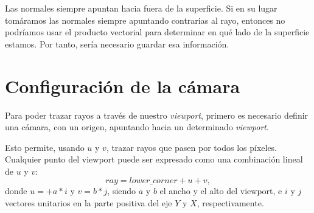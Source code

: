 \documentclass[12pt]{article}
\theoremstyle{definition}
\theoremstyle{remark}
\begin{document}
\tableofcontents

\vspace{1cm}

Las normales siempre apuntan hacia fuera de la superficie. Si en su lugar tomáramos las normales siempre apuntando contrarias al rayo, entonces no podríamos usar el producto vectorial para determinar en qué lado de la superficie estamos. Por tanto, sería necesario guardar esa información.


\section{Configuración de la cámara}

Para poder trazar rayos a través de nuestro \textit{viewport}, primero es necesario definir una cámara, con un origen, apuntando hacia un determinado \textit{viewport}.

\begin{figure}[H]
\centering
{}
\end{figure}

Esto permite, usando $u$ y $v$, trazar rayos que pasen por todos los píxeles. Cualquier punto del viewport puede ser expresado como una combinación lineal de $u$ y $v$: 
\[
ray=lower\_corner+u+v,
\]
donde $u=+a*i$ y $v=b*j$, siendo $a$ y $b$ el ancho y el alto del viewport, e $i$ y $j$ vectores unitarios en la parte positiva del eje $Y$ y $X$, respectivamente. 
\end{document}
